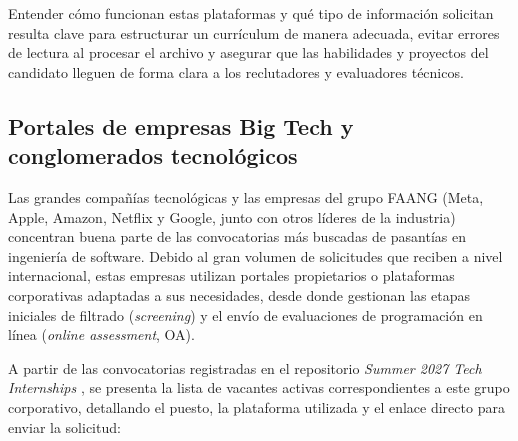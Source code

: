\documentclass[12pt]{article}
\begin{document}
Entender cómo funcionan estas plataformas y qué tipo de información solicitan resulta clave para estructurar un currículum de manera adecuada, evitar errores de lectura al procesar el archivo y asegurar que las habilidades y proyectos del candidato lleguen de forma clara a los reclutadores y evaluadores técnicos.

\subsection{Portales de empresas Big Tech y conglomerados tecnológicos}
\label{sec:portalesCorporativos}

Las grandes compañías tecnológicas y las empresas del grupo FAANG (Meta, Apple, Amazon, Netflix y Google, junto con otros líderes de la industria) concentran buena parte de las convocatorias más buscadas de pasantías en ingeniería de software. Debido al gran volumen de solicitudes que reciben a nivel internacional, estas empresas utilizan portales propietarios o plataformas corporativas adaptadas a sus necesidades, desde donde gestionan las etapas iniciales de filtrado (\textit{screening}) y el envío de evaluaciones de programación en línea (\textit{online assessment}, OA).

A partir de las convocatorias registradas en el repositorio \textit{Summer 2027 Tech Internships} \parencite{simplifyjobs2026summer}, se presenta la lista de vacantes activas correspondientes a este grupo corporativo, detallando el puesto, la plataforma utilizada y el enlace directo para enviar la solicitud:
\end{document}
